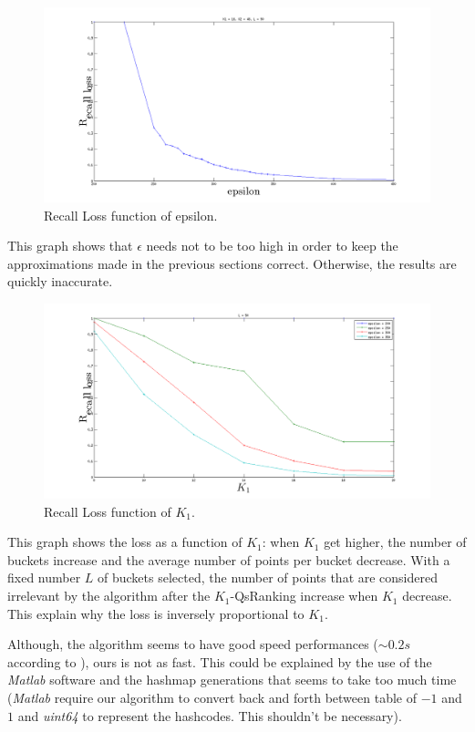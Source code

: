 \documentclass{article}
\begin{document}
\begin{figure}[htbp]
	\begin{center}
	\includegraphics[width=.8\linewidth]{Images/rloss.png}
	\end{center}
	\caption{Recall Loss function of epsilon.}
	\label{fig:rloss}
\end{figure}

This graph shows that $\epsilon$ needs not to be too high in order to keep the approximations made in the previous sections correct. Otherwise, the results are quickly inaccurate.

\begin{figure}[htbp]
	\begin{center}
	\includegraphics[width=.8\linewidth]{Images/k1_rloss.png}
	\end{center}
	\caption{Recall Loss function of $K_1$.}
	\label{fig:k1_rloss}
\end{figure}

This graph shows the loss as a function of $K_1$: when $K_1$ get higher, the number of buckets increase and the average number of points per bucket decrease. With a fixed number $L$ of buckets selected, the number of points that are considered irrelevant by the algorithm after the $K_1$-QsRanking increase when $K_1$ decrease. This explain why the loss is inversely proportional to $K_1$.

Although, the algorithm seems to have good speed performances ($\sim 0.2s$ according to \citep{QSRank}), ours is not as fast. This could be explained by the use of the \textit{Matlab} software and the hashmap generations that seems to take too much time (\textit{Matlab} require our algorithm to convert back and forth between table of $-1$ and $1$ and \textit{uint64} to represent the hashcodes. This shouldn't be necessary).
\end{document}
